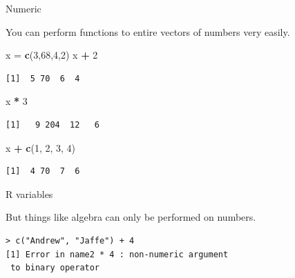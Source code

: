 \documentclass[
  ignorenonframetext,
]{beamer}
\newenvironment{Shaded}{\begin{snugshade}}{\end{snugshade}}
\newcommand{\DecValTok}[1]{\textcolor[rgb]{0.00,0.00,0.81}{#1}}
\newcommand{\KeywordTok}[1]{\textcolor[rgb]{0.13,0.29,0.53}{\textbf{#1}}}
\newcommand{\NormalTok}[1]{#1}
\newcommand{\OperatorTok}[1]{\textcolor[rgb]{0.81,0.36,0.00}{\textbf{#1}}}
\newcommand{\StringTok}[1]{\textcolor[rgb]{0.31,0.60,0.02}{#1}}
\begin{document}
\begin{frame}[fragile]{Numeric}
\protect\hypertarget{numeric}{}

You can perform functions to entire vectors of numbers very easily.

\begin{Shaded}
\begin{Highlighting}[]
\NormalTok{x =}\StringTok{ }\KeywordTok{c}\NormalTok{(}\DecValTok{3}\NormalTok{,}\DecValTok{68}\NormalTok{,}\DecValTok{4}\NormalTok{,}\DecValTok{2}\NormalTok{)}
\NormalTok{x }\OperatorTok{+}\StringTok{ }\DecValTok{2}
\end{Highlighting}
\end{Shaded}

\begin{verbatim}
[1]  5 70  6  4
\end{verbatim}

\begin{Shaded}
\begin{Highlighting}[]
\NormalTok{x }\OperatorTok{*}\StringTok{ }\DecValTok{3}
\end{Highlighting}
\end{Shaded}

\begin{verbatim}
[1]   9 204  12   6
\end{verbatim}

\begin{Shaded}
\begin{Highlighting}[]
\NormalTok{x }\OperatorTok{+}\StringTok{ }\KeywordTok{c}\NormalTok{(}\DecValTok{1}\NormalTok{, }\DecValTok{2}\NormalTok{, }\DecValTok{3}\NormalTok{, }\DecValTok{4}\NormalTok{)}
\end{Highlighting}
\end{Shaded}

\begin{verbatim}
[1]  4 70  7  6
\end{verbatim}

\end{frame}

\begin{frame}[fragile]{R variables}
\protect\hypertarget{r-variables-2}{}

But things like algebra can only be performed on numbers.

\begin{verbatim}
> c("Andrew", "Jaffe") + 4
[1] Error in name2 * 4 : non-numeric argument
 to binary operator
\end{verbatim}

\end{frame}
\end{document}
